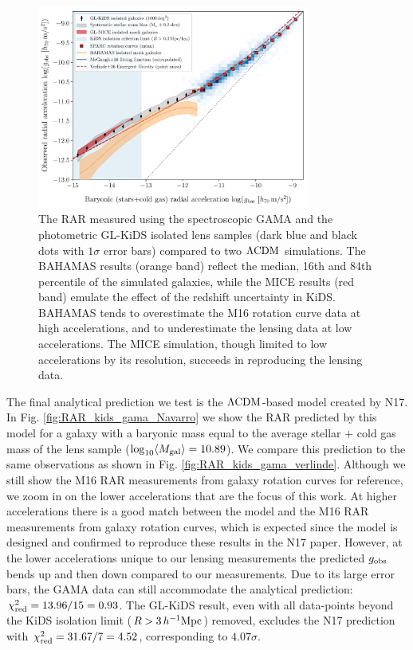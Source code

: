 \documentclass[usenatbib]{mnras}
\newcommand{\hMpc}{\, h^{-1}{\rm{Mpc}} }
\newcommand{\lcdm}{{\rm \Lambda CDM}}
\newcommand*{\meanb}[1]{\langle{#1}\rangle}
\newcommand{\un}[1]{_{\rm #1}}
\begin{document}
\begin{figure}
	\includegraphics[width=0.8\textwidth]{Figures/RAR_KiDS+MICE+Bahamas+Verlinde_No_Nobins_isolated_zoomout.pdf}
	\caption{The RAR measured using the spectroscopic GAMA and the photometric GL-KiDS isolated lens samples (dark blue and black dots with $1\sigma$ error bars) compared to two $\lcdm$ simulations. The BAHAMAS results (orange band) reflect the median, 16th and 84th percentile of the simulated galaxies, while the MICE results (red band) emulate the effect of the redshift uncertainty in KiDS. BAHAMAS tends to overestimate the M16 rotation curve data at high accelerations, and to underestimate the lensing data at low accelerations. The MICE simulation, though limited to low accelerations by its resolution, succeeds in reproducing the lensing data.}
	\label{fig:RAR_kids_mice_bahamas}
\end{figure}

The final analytical prediction we test is the $\lcdm$-based model created by N17. In Fig. \ref{fig:RAR_kids_gama_Navarro} we show the RAR predicted by this model for a galaxy with a baryonic mass equal to the average stellar + cold gas mass of the lens sample ($\log_{10}\meanb{M\un{gal}} = 10.89$). We compare this prediction to the same observations as shown in Fig. \ref{fig:RAR_kids_gama_verlinde}. Although we still show the M16 RAR measurements from galaxy rotation curves for reference, we zoom in on the lower accelerations that are the focus of this work. At higher accelerations there is a good match between the model and the M16 RAR measurements from galaxy rotation curves, which is expected since the model is designed and confirmed to reproduce these results in the N17 paper. However, at the lower accelerations unique to our lensing measurements the predicted $g\un{obs}$ bends up and then down compared to our measurements. Due to its large error bars, the GAMA data can still accommodate the analytical prediction: $\chi\un{red}^2 = 13.96 / 15 = 0.93$. The GL-KiDS result, even with all data-points beyond the KiDS isolation limit ($R>3 \hMpc$) removed, excludes the N17 prediction with $\chi\un{red}^2 = 31.67 / 7 = 4.52$, corresponding to $4.07 \sigma$.
\end{document}
